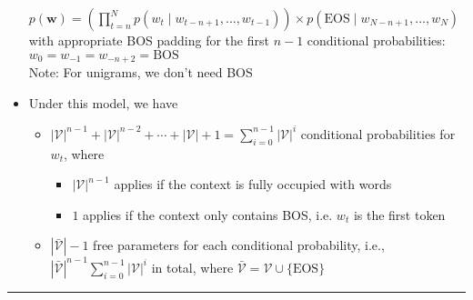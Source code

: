 \begin{itemize}
    $
    p(\boldsymbol{w}) = \left(\prod_{t=n}^N p(w_t \mid w_{t-n+1}, \ldots, w_{t-1})\right) \times p(\textrm{EOS} \mid w_{N-n+1}, \ldots, w_N) 
    $ with appropriate BOS padding for the first $n-1$ conditional probabilities: $w_0 = w_{-1} = w_{-n+2} = \textrm{BOS}$\\
    Note: For unigrams, we don't need BOS
    \item Under this model, we have 
    \begin{itemize}
        \item $
        |\mathcal{V}|^{n-1} + |\mathcal{V}|^{n-2} + \cdots + |\mathcal{V}| + 1 = \sum_{i=0}^{n-1} |\mathcal{V}|^i
        $
        conditional probabilities for $w_t$, where 
        \begin{itemize}
            \item $|\mathcal{V}|^{n-1}$ applies if the context is fully occupied with words
            \item $1$ applies if the context only contains BOS, i.e. $w_t$ is the first token
        \end{itemize}
        \item $|\bar{\mathcal{V}}|-1$ free parameters for each conditional probability, i.e., $|\bar{\mathcal{V}}|^{n-1} \sum_{i=0}^{n-1} |\mathcal{V}|^i$ in total, where $\bar{\mathcal{V}} = \mathcal{V} \cup \{\textrm{EOS}\}$
    \end{itemize}
\end{itemize}

{\color{black}\hrule height 0.001mm}

